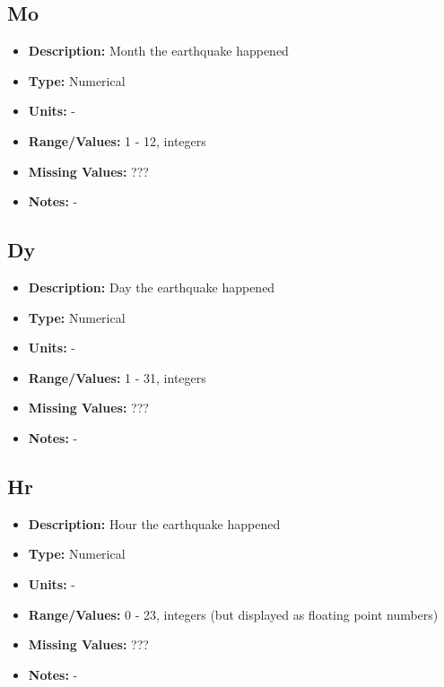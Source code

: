 \documentclass{article}
\begin{document}
\subsection{Mo}
\begin{itemize}
    \item \textbf{Description:} Month the earthquake happened
    \item \textbf{Type:} Numerical
    \item \textbf{Units:} -
    \item \textbf{Range/Values:} 1 - 12, integers
    \item \textbf{Missing Values:} ???
    \item \textbf{Notes:} -
\end{itemize}

\subsection{Dy}
\begin{itemize}
    \item \textbf{Description:} Day the earthquake happened 
    \item \textbf{Type:} Numerical
    \item \textbf{Units:} -
    \item \textbf{Range/Values:} 1 - 31, integers
    \item \textbf{Missing Values:} ???
    \item \textbf{Notes:} -
\end{itemize}

\subsection{Hr}
\begin{itemize}
    \item \textbf{Description:} Hour the earthquake happened  
    \item \textbf{Type:} Numerical
    \item \textbf{Units:} -
    \item \textbf{Range/Values:} 0 - 23, integers (but displayed as floating point numbers)
    \item \textbf{Missing Values:} ???
    \item \textbf{Notes:} -
\end{itemize}
\end{document}

